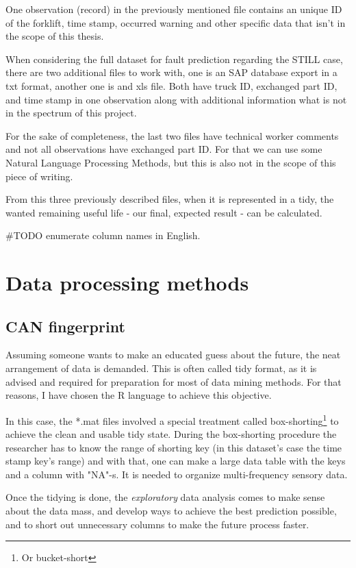 One observation (record) in the previously mentioned file contains an unique ID of the forklift, time stamp, occurred warning and other specific data that isn't in the scope of this thesis.

When considering the full dataset for fault prediction regarding the STILL case, there are two additional files to work with, one is an SAP database export in a txt format, another one is and xls file. Both have truck ID, exchanged part ID, and time stamp in one observation along with additional information what is not in the spectrum of this project.

For the sake of completeness, the last two files have technical worker comments and not all observations have exchanged part ID. For that we can use some Natural Language Processing Methods, but this is also not in the scope of this piece of writing.

From this three previously described files, when it is represented in a tidy, the wanted remaining useful life  - our final, expected result - can be calculated.

\#TODO enumerate column names in English.
	\section{Data processing methods}
		\subsection{CAN fingerprint}
Assuming someone wants to make an educated guess about the future, the neat arrangement of data is demanded. This is often called tidy format, as it is advised and required for preparation for most of data mining methods. For that reasons, I have chosen the R language to achieve this objective.

In this case, the *.mat files involved a special treatment called box-shorting\footnote{Or bucket-short} \cite{Bucketshort} to achieve the clean and usable tidy state. During the box-shorting procedure the researcher has to know the range of shorting key (in this dataset's case the time stamp key's range) and with that, one can make a large data table with the keys and a column with "NA"-s. It is needed to organize multi-frequency sensory data.

Once the tidying is done, the \textit{exploratory} data analysis comes to make sense about the data mass, and develop ways to achieve the best prediction possible, and to short out unnecessary columns to make the future process faster.
